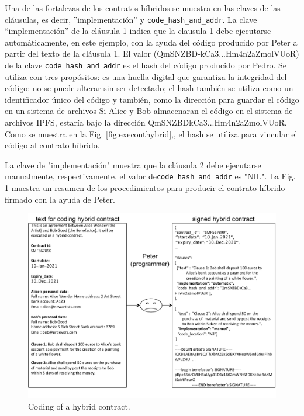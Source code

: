 \documentclass[12pt]{report} %
\begin{document}
Una de las fortalezas de los contratos híbridos se muestra en las claves de las cláusulas, es decir, ”implementación” y \verb+code_hash_and_addr+.  La clave “implementación” de la cláusula 1 indica que la clausula 1 debe ejecutarse automáticamente, en este ejemplo, con la ayuda del código producido por Peter a partir del texto de la cláusula 1. El valor (QmSNZBD-kCa3...Hm4n2aZmolVUoR) de la clave \verb+code_hash_and_addr+ es el hash del código producido por Pedro. Se utiliza con tres propósitos: es una huella digital que garantiza la integridad del código: no se puede alterar sin ser detectado; el hash también se utiliza como un identificador único del código y también, como la dirección para guardar el código en un sistema de archivos Si Alice y Bob almacenaran el código en el sistema de archivos IPFS, estaría bajo la dirección QmSNZBDkCa3...Hm4n2aZmolVUoR. Como se muestra en la Fig. \ref{fig:execonthybrid},, el hash se utiliza para vincular el código al contrato híbrido.



La clave de "implementación" muestra que la cláusula 2 debe ejecutarse manualmente, respectivamente, el valor de\verb+code_hash_and_addr+ es "NIL". La Fig. \ref{fig:contcodinghybrid} muestra un resumen de los procedimientos para producir el contrato híbrido firmado con la ayuda de Peter.


\begin{figure}
\centering
\includegraphics[width=0.98\columnwidth]{figures/contcodinghybrid.pdf}
\caption{Coding of a hybrid contract.} 
\label{fig:contcodinghybrid}
\end{figure}
 
\end{document}

